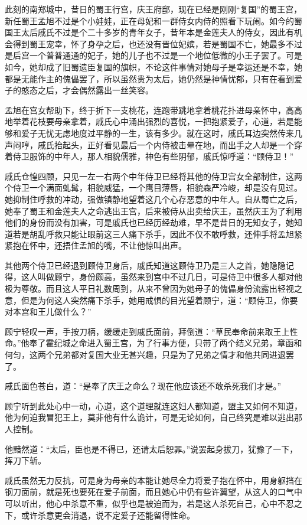 此刻的南郑城中，昔日的蜀王行宫，庆王府邸，现在已经是刚刚“复国”的蜀王宫，新任蜀王孟旭不过是个小娃娃，正在母妃和一群侍女内侍的照看下玩闹。如今的蜀国王太后戚氏不过是个二十多岁的青年女子，昔年本是金莲夫人的侍女，因此有机会得到蜀王宠幸，怀了身孕之后，也还没有晋位妃嫔，若是蜀国不亡，她最多不过是后宫一个普普通通的妃子，她的儿子也不过是一个地位低微的小王子罢了。可是如今，她却成了旧蜀遗臣复国的旗帜，不论这件事情对她母子是幸运还是不幸，她都是无能作主的傀儡罢了，所以虽然贵为太后，她仍然是神情忧郁，只有在看到爱子的憨态之后，才会偶然露出一丝笑容。

孟旭在宫女帮助下，终于折下一支桃花，连跑带跳地拿着桃花扑进母亲怀中，高高地举着花枝要母亲拿着，戚氏心中涌出强烈的喜悦，一把抱紧爱子，心道，若是能够和爱子无忧无虑地度过平静的一生，该有多少。就在这时，戚氏耳边突然传来几声闷哼，戚氏抬起头，正好看见最后一个内侍被击晕在地，而出手之人却是一个穿着侍卫服饰的中年人，那人相貌儒雅，神色有些阴郁，戚氏惊呼道：“顾侍卫！”

戚氏仓惶四顾，只见一左一右两个中年侍卫已经将其他的侍卫宫女全部制住，这两个侍卫一个满面虬髯，相貌威猛，一个鹰目薄唇，相貌森严冷峻，却是没有见过。她抑制住呼救的冲动，强做镇静地望着这几个心存恶意的中年人。自从蜀亡之后，她奉了蜀王和金莲夫人之命逃出王宫，后来被侍从出卖给庆王，虽然庆王为了利用他们的身份而没有加害，可是戚氏也已经历经劫难，早不是昔日的无知女子，她知道若是胡乱呼救只能让眼前这三人痛下杀手，因此不仅不敢呼救，还伸手将孟旭紧紧抱在怀中，还捂住孟旭的嘴，不让他惊叫出声。

其他两个侍卫已经退到顾侍卫身后，戚氏知道这顾侍卫乃是三人之首，她隐隐记得，这人叫做顾宁，身份颇高，虽然来到宫中不过几日，可是侍卫中很多人都对他极为尊敬。而且这人平日礼数周到，从来不曾因为她母子的傀儡身份流露出轻视之意，但是为何这人突然痛下杀手，她用戒惧的目光望着顾宁，道：“顾侍卫，你要对本宫和王儿做什么？”

顾宁轻叹一声，手按刀柄，缓缓走到戚氏面前，拜倒道：“草民奉命前来取王上性命。”他奉了霍纪城之命进入蜀王宫，为了行事方便，只带了两个结义兄弟，章函和何匀，这两个兄弟都对复国大业无甚兴趣，只是为了兄弟之情才和他共同进退罢了。

戚氏面色苍白，道：“是奉了庆王之命么？现在他应该还不敢杀死我们才是。”

顾宁听到此处心中一动，心道，这个道理就连这妇人都知道，盟主又如何不知道，他为何迫我冒犯王上，莫非他有什么诡计，可是无论如何，自己终究是难以逃出那人控制。

他黯然道：“太后，臣也是不得已，还请太后恕罪。”说罢起身拔刀，犹豫了一下，挥刀下斩。

戚氏虽然无力反抗，可是身为母亲的本能让她尽全力将爱子抱在怀中，用身躯挡在钢刀面前，就是死也要死在爱子前面，而且她心中仍有些许翼望，从这人的口气中可以听出，他心中杀意不重，似乎也是被迫而为，若是这人杀死自己，心中不忍之下，或许杀意更会消退，说不定爱子还能留得性命。

